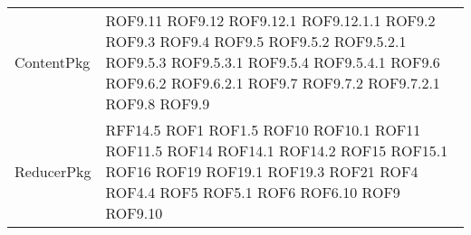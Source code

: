 \begin{longtable}{p{5cm}!{\VRule[1pt]}p{2.5cm}}
		ContentPkg & ROF9.11 \newline ROF9.12 \newline ROF9.12.1 \newline ROF9.12.1.1 \newline ROF9.2 \newline ROF9.3 \newline ROF9.4 \newline ROF9.5 \newline ROF9.5.2 \newline ROF9.5.2.1 \newline ROF9.5.3 \newline ROF9.5.3.1 \newline ROF9.5.4 \newline ROF9.5.4.1 \newline ROF9.6 \newline ROF9.6.2 \newline ROF9.6.2.1 \newline ROF9.7 \newline ROF9.7.2 \newline ROF9.7.2.1 \newline ROF9.8 \newline ROF9.9\\
		ReducerPkg & RFF14.5 \newline ROF1 \newline ROF1.5 \newline ROF10 \newline ROF10.1 \newline ROF11 \newline ROF11.5 \newline ROF14 \newline ROF14.1 \newline ROF14.2 \newline ROF15 \newline ROF15.1 \newline ROF16 \newline ROF19 \newline ROF19.1 \newline ROF19.3 \newline ROF21 \newline ROF4 \newline ROF4.4 \newline ROF5 \newline ROF5.1 \newline ROF6 \newline ROF6.10 \newline ROF9 \newline ROF9.10\\

\end{longtable}
